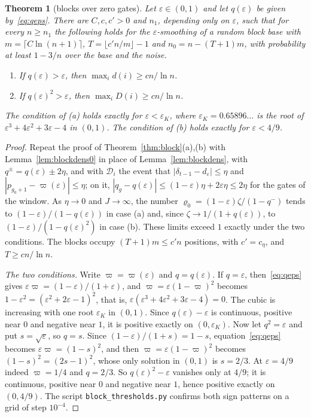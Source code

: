 \documentclass[11pt]{amsart}
\newtheorem{theorem}{Theorem}
\theoremstyle{definition}
\theoremstyle{remark}
\newcommand{\eps}{\varepsilon}
\begin{document}
\begin{theorem}[blocks over zero gates]\label{thm:blockzero}
Let $\eps\in(0,1)$ and let $q(\eps)$ be given by~\eqref{eq:qeps}. There are $C,c,c'>0$ and $n_1$,
depending only on $\eps$, such that for every $n\ge n_1$ the following holds for the
$\eps$-smoothing of a random block base with $m=\lceil C\ln(n+1)\rceil$,
$T=\lfloor c'n/m\rfloor-1$ and $n_0=n-(T+1)m$, with probability at least $1-3/n$ over the base and
the noise.
\begin{enumerate}[label=(\alph*),leftmargin=2.4em]
\item If $q(\eps)>\eps$, then $\max_id(i)\ge cn/\ln n$.
\item If $q(\eps)^2>\eps$, then $\max_iD(i)\ge cn/\ln n$.
\end{enumerate}
The condition of (a) holds exactly for $\eps<\eps_K$, where $\eps_K=0.65896\ldots$ is the root of
$\eps^3+4\eps^2+3\eps-4$ in $(0,1)$. The condition of (b) holds exactly for $\eps<4/9$.
\end{theorem}

\begin{proof}
Repeat the proof of Theorem~\ref{thm:block}(a),(b) with Lemma~\ref{lem:blockdens0} in place of
Lemma~\ref{lem:blockdens}, with $q^\pm=q(\eps)\pm2\eta$, and with $\mathcal D_i$ the event that
$|\delta_{t-1}-d_\eps|\le\eta$ and $|p_{g_0+1}-\varpi(\eps)|\le\eta$; on it,
$|q_g-q(\eps)|\le(1-\eps)\eta+2\eps\eta\le2\eta$ for the gates of the window. As $\eta\to0$ and
$J\to\infty$, the number $\varrho_0=(1-\eps)\zeta/(1-q^-)$ tends to $(1-\eps)/(1-q(\eps))$ in case
(a) and, since $\zeta\to1/(1+q(\eps))$, to $(1-\eps)/(1-q(\eps)^2)$ in case (b). These limits
exceed $1$ exactly under the two conditions. The blocks occupy $(T+1)m\le c'n$ positions, with
$c'=c_\eta$, and $T\ge cn/\ln n$.

\emph{The two conditions.} Write $\varpi=\varpi(\eps)$ and $q=q(\eps)$. If $q=\eps$,
then~\eqref{eq:qeps} gives $\eps\varpi=(1-\eps)/(1+\eps)$, and $\varpi=\eps(1-\varpi)^2$ becomes
$1-\eps^2=(\eps^2+2\eps-1)^2$, that is, $\eps(\eps^3+4\eps^2+3\eps-4)=0$. The cubic is increasing
with one root $\eps_K$ in $(0,1)$. Since $q(\eps)-\eps$ is continuous, positive near $0$ and
negative near $1$, it is positive exactly on $(0,\eps_K)$. Now let $q^2=\eps$ and put
$s=\sqrt\eps$, so $q=s$. Since $(1-\eps)/(1+s)=1-s$, equation~\eqref{eq:qeps} becomes
$\eps\varpi=(1-s)^2$, and then $\varpi=\eps(1-\varpi)^2$ becomes $(1-s)^2=(2s-1)^2$, whose only
solution in $(0,1)$ is $s=2/3$. At $\eps=4/9$ indeed $\varpi=1/4$ and $q=2/3$. So
$q(\eps)^2-\eps$ vanishes only at $4/9$; it is continuous, positive near $0$ and negative near
$1$, hence positive exactly on $(0,4/9)$. The script \texttt{block\_thresholds.py} confirms both
sign patterns on a grid of step $10^{-4}$.
\end{proof}
\end{document}
